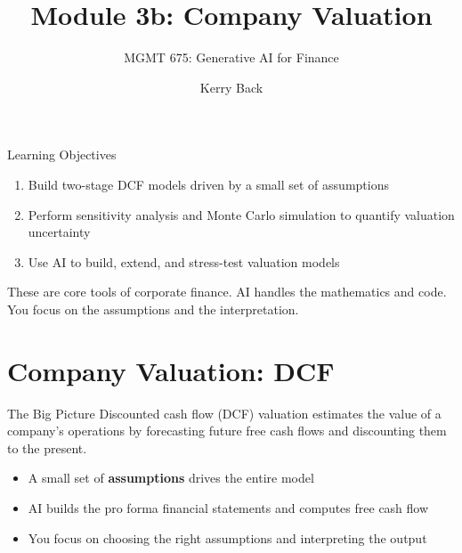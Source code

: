 \documentclass[aspectratio=169]{beamer}
\subtitle{MGMT 675: Generative AI for Finance}
\title{Module 3b: Company Valuation}
\author{Kerry Back}
\date{}
\begin{document}
\maketitle

\begin{frame}{Learning Objectives}
\begin{enumerate}
  \item Build two-stage DCF models driven by a small set of assumptions
  \item Perform sensitivity analysis and Monte Carlo simulation to quantify valuation uncertainty
  \item Use AI to build, extend, and stress-test valuation models
\end{enumerate}

\vspace{0.5cm}
These are core tools of corporate finance.  AI handles the mathematics and code.  \alert{You focus on the assumptions and the interpretation.}
\end{frame}

\section{Company Valuation: DCF}

\begin{frame}{The Big Picture}
Discounted cash flow (DCF) valuation estimates the value of a company's operations by forecasting future free cash flows and discounting them to the present.

\vspace{0.3cm}
\begin{itemize}
  \item A small set of \textbf{assumptions} drives the entire model
  \item AI builds the pro forma financial statements and computes free cash flow
  \item You focus on \alert{choosing the right assumptions} and \alert{interpreting the output}
\end{itemize}
\end{frame}
\end{document}

